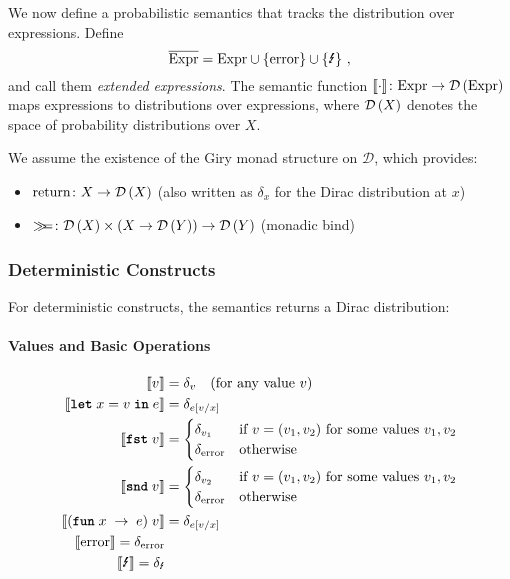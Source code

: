 We now define a probabilistic semantics that tracks the distribution over expressions. Define
%
\[
	\extexprs = \exprs \cup  \{ \error \} \cup \{ \obsfail \}~,
\]
%
and call them \emph{extended expressions}.
%
The semantic function $\llbracket \cdot \rrbracket \colon \textnormal{Expr} \rightarrow \mathcal{D}\left( \textnormal{Expr} \right)$ maps expressions to distributions over expressions, where $\mathcal{D}\left( X \right)$ denotes the space of probability distributions over $X$.

We assume the existence of the Giry monad structure on $\mathcal{D}$, which provides:
\begin{itemize}
    \item $\textnormal{return} \colon X \rightarrow \mathcal{D}\left( X \right)$ (also written as $\delta_x$ for the Dirac distribution at $x$)
    \item $\gg\!\!= \colon \mathcal{D}\left( X \right) \times (X \to \mathcal{D}\left( Y \right)) \rightarrow \mathcal{D}\left( Y \right)$ (monadic bind)
\end{itemize}

\subsubsection{Deterministic Constructs}

For deterministic constructs, the semantics returns a Dirac distribution:

\paragraph{Values and Basic Operations}
\begin{align*}
\sem{\val} &= \delta_\val \quad \text{(for any value } \val \text{)} \\
\sem{\letkw \; \var = \val \; \inkw \; \expr} &= \delta_{\expr\subst{\val}{\var}} \\
%
%
\sem{ \fstkw \; \val} & = 
\begin{cases}
	\delta_{\val_1}  & \text{if $\val = (\val_1,\val_2)$ for some values $\val_1,\val_2$} \\
	\delta_{\error}  & \text{otherwise}
\end{cases}
%
\\
%
%
\sem{ \sndkw \; \val} & = 
\begin{cases}
	\delta_{\val_2}  & \text{if $\val = (\val_1,\val_2)$ for some values $\val_1,\val_2$} \\
	\delta_{\error}  & \text{otherwise}
\end{cases}
%
\\
%
\sem{ (\funkw \; \var \; \rightarrow \; \expr) \; \val } &= \delta_{\expr\subst{\val}{\var}}\\
\sem{\error} = \delta_\error \\
\sem{\obsfail} = \delta_\obsfail
\end{align*}
%


